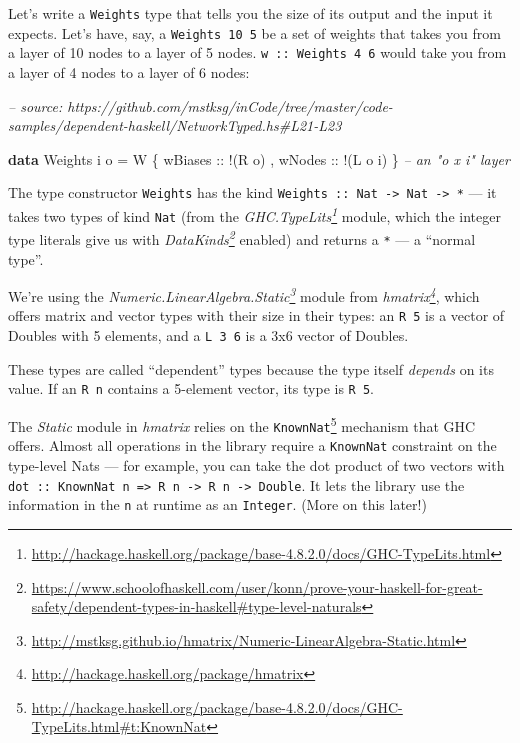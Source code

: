 \documentclass[]{article}
\newenvironment{Shaded}{}{}
\newcommand{\CommentTok}[1]{\textcolor[rgb]{0.38,0.63,0.69}{\textit{#1}}}
\newcommand{\DataTypeTok}[1]{\textcolor[rgb]{0.56,0.13,0.00}{#1}}
\newcommand{\FunctionTok}[1]{\textcolor[rgb]{0.02,0.16,0.49}{#1}}
\newcommand{\KeywordTok}[1]{\textcolor[rgb]{0.00,0.44,0.13}{\textbf{#1}}}
\newcommand{\NormalTok}[1]{#1}
\newcommand{\OtherTok}[1]{\textcolor[rgb]{0.00,0.44,0.13}{#1}}
\renewcommand{\href}[2]{#2\footnote{\url{#1}}}
\begin{document}
Let's write a \texttt{Weights} type that tells you the size of its output and
the input it expects. Let's have, say, a \texttt{Weights\ 10\ 5} be a set of
weights that takes you from a layer of 10 nodes to a layer of 5 nodes.
\texttt{w\ ::\ Weights\ 4\ 6} would take you from a layer of 4 nodes to a layer
of 6 nodes:

\begin{Shaded}
\begin{Highlighting}[]
\CommentTok{-- source: https://github.com/mstksg/inCode/tree/master/code-samples/dependent-haskell/NetworkTyped.hs#L21-L23}

\KeywordTok{data} \DataTypeTok{Weights}\NormalTok{ i o }\FunctionTok{=} \DataTypeTok{W}\NormalTok{ \{}\OtherTok{ wBiases ::} \FunctionTok{!}\NormalTok{(}\DataTypeTok{R}\NormalTok{ o)}
\NormalTok{                     ,}\OtherTok{ wNodes  ::} \FunctionTok{!}\NormalTok{(}\DataTypeTok{L}\NormalTok{ o i)}
\NormalTok{                     \}                      }\CommentTok{-- an "o x i" layer}
\end{Highlighting}
\end{Shaded}

The type constructor \texttt{Weights} has the kind
\texttt{Weights\ ::\ Nat\ -\textgreater{}\ Nat\ -\textgreater{}\ *} --- it takes
two types of kind \texttt{Nat} (from the
\emph{\href{http://hackage.haskell.org/package/base-4.8.2.0/docs/GHC-TypeLits.html}{GHC.TypeLits}}
module, which the integer type literals give us with
\emph{\href{https://www.schoolofhaskell.com/user/konn/prove-your-haskell-for-great-safety/dependent-types-in-haskell\#type-level-naturals}{DataKinds}}
enabled) and returns a \texttt{*} --- a ``normal type''.

We're using the
\emph{\href{http://mstksg.github.io/hmatrix/Numeric-LinearAlgebra-Static.html}{Numeric.LinearAlgebra.Static}}
module from \emph{\href{http://hackage.haskell.org/package/hmatrix}{hmatrix}},
which offers matrix and vector types with their size in their types: an
\texttt{R\ 5} is a vector of Doubles with 5 elements, and a \texttt{L\ 3\ 6} is
a 3x6 vector of Doubles.

These types are called ``dependent'' types because the type itself
\emph{depends} on its value. If an \texttt{R\ n} contains a 5-element vector,
its type is \texttt{R\ 5}.

The \emph{Static} module in \emph{hmatrix} relies on the
\href{http://hackage.haskell.org/package/base-4.8.2.0/docs/GHC-TypeLits.html\#t:KnownNat}{\texttt{KnownNat}}
mechanism that GHC offers. Almost all operations in the library require a
\texttt{KnownNat} constraint on the type-level Nats --- for example, you can
take the dot product of two vectors with
\texttt{dot\ ::\ KnownNat\ n\ =\textgreater{}\ R\ n\ -\textgreater{}\ R\ n\ -\textgreater{}\ Double}.
It lets the library use the information in the \texttt{n} at runtime as an
\texttt{Integer}. (More on this later!)
\end{document}
